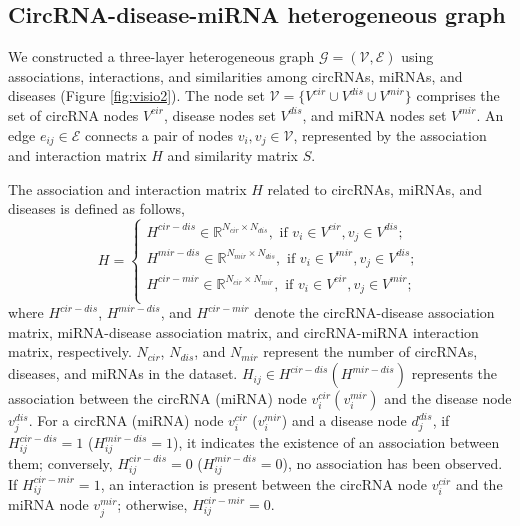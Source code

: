 \documentclass[journal=jcisd8,manuscript=article]{achemso}
\begin{document}
\subsection{CircRNA-disease-miRNA heterogeneous graph}
\vspace{-0.3cm}
We constructed a three-layer heterogeneous graph $\mathcal{G}=(\mathcal{V}, \mathcal{E})$ using associations, interactions, and similarities among circRNAs, miRNAs, and diseases (Figure \ref{fig:visio2}). The node set $\mathcal{V}=\{V^{cir}\cup V^{dis}\cup V^{mir}\}$ comprises the set of circRNA nodes $V^{cir}$, disease nodes set $V^{dis}$, and miRNA nodes set $V^{mir}$. An edge $e_{ij} \in \mathcal{E}$ connects a pair of nodes $v_i,v_j \in \mathcal{V}$, represented by the association and interaction matrix $H$ and similarity matrix $S$.

The association and interaction matrix $H$ related to circRNAs, miRNAs, and diseases is defined as follows,
\begin{equation}
H = \left\{ \begin{array}{l}
{H^{cir-dis}} \in {\mathbb{R}^{N_{cir}\times N_{dis}}}, \text{ if } {v_i} \in {V^{cir}}, {v_j} \in {V^{dis}};\\[5pt]
{H^{mir-dis}} \in {\mathbb{R}^{N_{mir}\times N_{dis}}}, \text{ if } {v_i} \in {V^{mir}}, {v_j} \in {V^{dis}};\\[5pt]
{H^{cir-mir}} \in {\mathbb{R}^{N_{cir}\times N_{mir}}}, \text{ if } {v_i} \in {V^{cir}}, {v_j} \in {V^{mir}};\\
\end{array} \right.
\end{equation}
where $H^{cir-dis}$, $H^{mir-dis}$, and $H^{cir-mir}$ denote the circRNA-disease association matrix, miRNA-disease association matrix, and circRNA-miRNA interaction matrix, respectively. $N_{cir}$, $N_{dis}$, and $N_{mir}$ represent the number of circRNAs, diseases, and miRNAs in the dataset. 
$H_{ij} \in H^{cir-dis} (H^{mir-dis})$ represents the association between the circRNA (miRNA) node $v_i^{cir}(v_i^{mir})$ and the disease node $v_j^{dis}$. For a circRNA (miRNA) node $v_i^{cir}$ ($v_i^{mir}$) and a disease node $d_j^{dis}$, if $H_{ij}^{cir-dis}=1$ ($H_{ij}^{mir-dis}=1$), it indicates the existence of an association between them; conversely, $H_{ij}^{cir-dis}=0$ ($H_{ij}^{mir-dis}=0$), no association has been observed. If $H_{ij}^{cir-mir}=1$, an interaction is present between the circRNA node $v_i^{cir}$ and the miRNA node $v_j^{mir}$; otherwise, $H_{ij}^{cir-mir}=0$.
\end{document}
